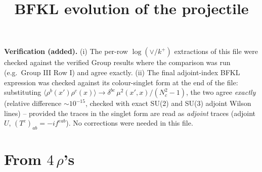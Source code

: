 \documentclass[9pt]{article}
\title{BFKL evolution of the projectile}
\author{}
\date{}
\numberwithin{equation}{section}
\begin{document}
{\color{red}\noindent\textbf{Verification (added).} (i) The per-row $\log(\vee/k^{+})$ extractions of this file were checked against the verified Group results where the comparison was run (e.g.\ Group III Row I) and agree exactly. (ii) The final adjoint-index BFKL expression was checked against its colour-singlet form at the end of the file: substituting $\langle\rho^{b}(x')\rho^{c}(x)\rangle\to\delta^{bc}\,\mu^{2}(x',x)/(N_{c}^{2}-1)$, the two agree \emph{exactly} (relative difference $\sim10^{-15}$, checked with exact SU(2) and SU(3) adjoint Wilson lines) -- provided the traces in the singlet form are read as \emph{adjoint} traces (adjoint $U$, $(T^{e})_{ab}=-if^{eab}$). No corrections were needed in this file.}
\maketitle
\section{From $4$\,$\rho$'s}
\end{document}
